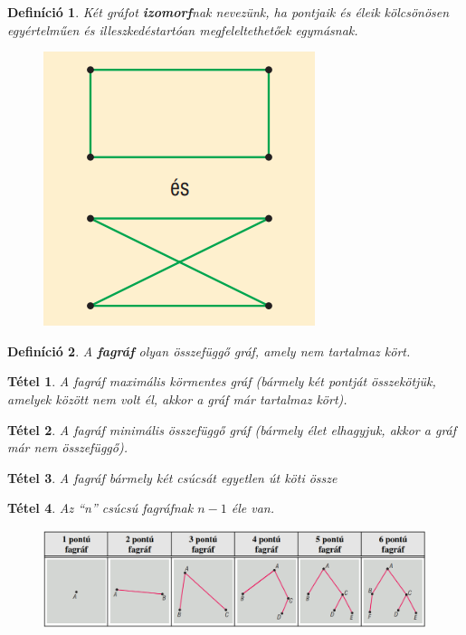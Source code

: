 \documentclass[12pt,a4paper]{article}
\newtheorem{theorem}{Tétel} [section]
\newtheorem{definition}{Definíció} [section]
\begin{document}
\begin{definition}
Két gráfot \textbf{izomorf}nak nevezünk, ha pontjaik és éleik kölcsönösen egyértelműen és illeszkedéstartóan megfeleltethetőek egymásnak.
\begin{figure}[h]
\centering
\includegraphics[scale=0.3]{geometry/izomorf_graf}
\end{figure}
\end{definition}

\begin{definition}
A \textbf{fagráf} olyan összefüggő gráf, amely nem tartalmaz kört.
\end{definition}

\begin{theorem}
A fagráf maximális körmentes gráf (bármely két pontját összekötjük, amelyek között nem volt él, akkor a gráf már tartalmaz kört).
\end{theorem}

\begin{theorem}
A fagráf minimális összefüggő gráf (bármely élet elhagyjuk, akkor a gráf már nem összefüggő).
\end{theorem}

\begin{theorem}
A fagráf bármely két csúcsát egyetlen út köti össze
\end{theorem}

\begin{theorem}
Az ``n'' csúcsú fagráfnak $n - 1$ éle van.
\end{theorem}

\begin{figure}[h]
\centering
\includegraphics[width=\textwidth]{geometry/fagrafok}
\end{figure}
\end{document}
